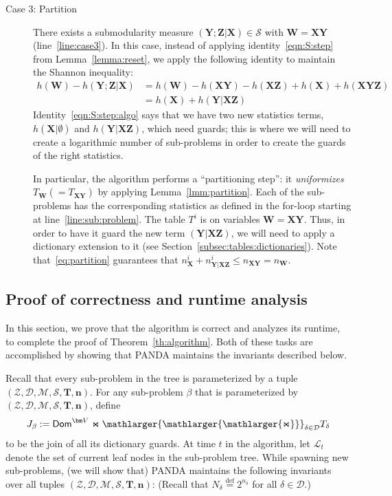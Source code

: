 \documentclass[10pt,a4paper]{article}
\newcommand{\dom}{\textsf{Dom}}
\newcommand{\calM}{\mathcal M}
\newcommand{\calS}{\mathcal S}
\newcommand{\calD}{\mathcal D}
\newcommand{\calL}{\mathcal L}
\newcommand{\calZ}{\mathcal Z}
\newcommand{\defeq}{\stackrel{\text{def}}{=}}
\newcommand{\bigjoin}{\mathlarger{\mathlarger{\mathlarger{\Join}}}}
\newcommand{\panda}{\textsf{PANDA}\xspace}
\begin{document}
\begin{description}
  \item[Case 3: Partition]  There exists a submodularity measure $(\bm Y;\bm Z|\bm X) \in \calS$ with
  $\bm W = \bm X\bm Y$ (line~\ref{line:case3}). In this case, instead of applying identity~\eqref{eqn:S:step} from Lemma~\ref{lemma:reset}, we apply the following identity
  to maintain the Shannon inequality:
  \begin{align}
    h(\bm W) -h(\bm Y;\bm Z|\bm X)&=
    h(\bm W) -h(\bm X\bm Y) - h(\bm X\bm Z) + h(\bm X) + h(\bm X \bm Y \bm Z) \nonumber \\
    &= h(\bm X)  + h(\bm Y|\bm X \bm Z)
    \label{eqn:S:step:algo}
  \end{align}
  Identity~\eqref{eqn:S:step:algo} says that we have two new statistics terms, $h(\bm X|\emptyset)$ and
  $h(\bm Y | \bm X \bm Z)$, which need guards; this is where we will need to create a logarithmic
  number of sub-problems in order to create the guards of the right statistics.

  In particular, the algorithm performs a ``partitioning step'': it {\em uniformizes}
  $T_{\bm W} (= T_{\bm X\bm Y})$ by applying Lemma~\ref{lmm:partition}.
  Each of the sub-problems has the corresponding statistics as defined
  in the for-loop starting at line~\ref{line:sub:problem}.
  The table $T^i$ is on variables $\bm W=\bm X\bm Y$. Thus, in order to have it guard
  the new term $(\bm Y|\bm X\bm Z)$, we will need to apply a dictionary extension to it (see Section~\ref{subsec:tables:dictionaries}).
  Note that~\eqref{eq:partition} guarantees that
  $n^i_{\bm X} + n^i_{\bm Y|\bm X\bm Z} \leq n_{\bm X \bm Y} = n_{\bm W}$.
\end{description}

\subsection{Proof of correctness and runtime analysis}
\label{subsec:analysis}

In this section, we prove that the algorithm is correct and analyzes its runtime, to
complete the proof of Theorem~\ref{th:algorithm}.
Both of these tasks are accomplished by showing that \panda maintains the invariants
described below.

Recall that every sub-problem in the tree is parameterized by a tuple
$(\calZ, \calD, \calM, \calS, \bm T, \bm n)$.
For any sub-problem $\beta$ that is parameterized by
$(\calZ, \calD, \calM, \calS, \bm T, \bm n)$, define
\[ J_\beta := \dom^{\bm V} \Join \bigjoin_{\delta \in \calD}T_{\delta} \]
to be the join of all its dictionary guards.
At time $t$ in the algorithm, let $\calL_t$ denote the set of current leaf nodes in the
sub-problem tree.
While spawning new sub-problems, (we will show that)
\panda maintains the following invariants over all tuples $(\calZ, \calD, \calM, \calS, \bm T, \bm n)$: (Recall that $N_\delta \defeq 2^{n_\delta}$ for all $\delta \in \calD$.)
\end{document}
